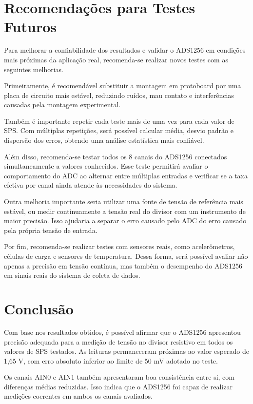 \documentclass[12pt, a4paper]{article}
\begin{document}
\section{Recomendações para Testes Futuros}

Para melhorar a confiabilidade dos resultados e validar o ADS1256 em condições mais próximas da aplicação real, recomenda-se realizar novos testes com as seguintes melhorias.

Primeiramente, é recomendável substituir a montagem em protoboard por uma placa de circuito mais estável, reduzindo ruídos, mau contato e interferências causadas pela montagem experimental.

Também é importante repetir cada teste mais de uma vez para cada valor de SPS. Com múltiplas repetições, 
será possível calcular média, desvio padrão e dispersão dos erros, obtendo uma análise estatística mais confiável.

Além disso, recomenda-se testar todos os 8 canais do ADS1256 conectados simultaneamente a valores conhecidos. 
Esse teste permitirá avaliar o comportamento do ADC ao alternar entre múltiplas entradas e verificar se a taxa efetiva por canal ainda atende às necessidades do sistema.

Outra melhoria importante seria utilizar uma fonte de tensão de referência mais estável, 
ou medir continuamente a tensão real do divisor com um instrumento de maior precisão. 
Isso ajudaria a separar o erro causado pelo ADC do erro causado pela própria tensão de entrada.

Por fim, recomenda-se realizar testes com sensores reais, como acelerômetros, células de carga e sensores de temperatura. 
Dessa forma, será possível avaliar não apenas a precisão em tensão contínua, mas também o desempenho do ADS1256 em sinais reais do sistema de coleta de dados.

\section{Conclusão}

Com base nos resultados obtidos, é possível afirmar que o ADS1256 apresentou precisão adequada para a medição de tensão no divisor resistivo em todos os valores de SPS testados. 
As leituras permaneceram próximas ao valor esperado de 1,65 V, com erro absoluto inferior ao limite de 50 mV adotado no teste.

Os canais AIN0 e AIN1 também apresentaram boa consistência entre si, com diferenças médias reduzidas. 
Isso indica que o ADS1256 foi capaz de realizar medições coerentes em ambos os canais avaliados.
\end{document}
